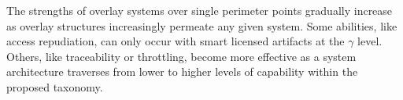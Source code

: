 The strengths of overlay systems over single perimeter points gradually increase as overlay structures increasingly permeate any given system.  Some abilities, like access repudiation, can only occur with smart licensed artifacts at the $\gamma$ level.  Others, like traceability or throttling, become more effective as a system architecture traverses from lower to higher levels of capability within the proposed taxonomy.